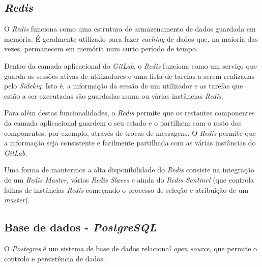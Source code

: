 \documentclass[12pt,a4paper]{article}
\begin{document}
\subsection{\emph{Redis}}
O \emph{Redis} funciona como uma estrutura de armazenamento de dados guardada em memória. É geralmente utilizado para fazer \emph{caching} de dados que, na maioria das vezes, permanecem em memória num curto período de tempo.

Dentro da camada aplicacional do \emph{GitLab}, o \emph{Redis} funciona como um serviço que guarda as sessões ativas de utilizadores e uma lista de tarefas a serem realizadas pelo \emph{Sidekiq}. Isto é, a informação da sessão de um utilizador e as tarefas que estão a ser executadas são guardadas numa ou várias instâncias \emph{Redis}.

Para além destas funcionalidades, o \emph{Redis} permite que os restantes componentes da camada aplicacional guardem o seu estado e o partilhem com o resto dos componentes, por exemplo, através de trocas de messagens. O \emph{Redis} permite que a informação seja consistente e facilmente partilhada com as várias instâncias do \emph{GitLab}.

Uma forma de mantermos a alta disponibilidade do \emph{Redis} consiste na integração de um \emph{Redis Master}, vários \emph{Redis Slaves} e ainda do \emph{Redis Sentinel} (que controla falhas de instâncias \emph{Redis} começando o processo de seleção e atribuição de um \emph{master}).





\subsection{Base de dados - \emph{PostgreSQL}}
O \emph{Postegres} é um sistema de base de dados relacional \emph{open source}, que permite o controlo e persistência de dados.
\end{document}
